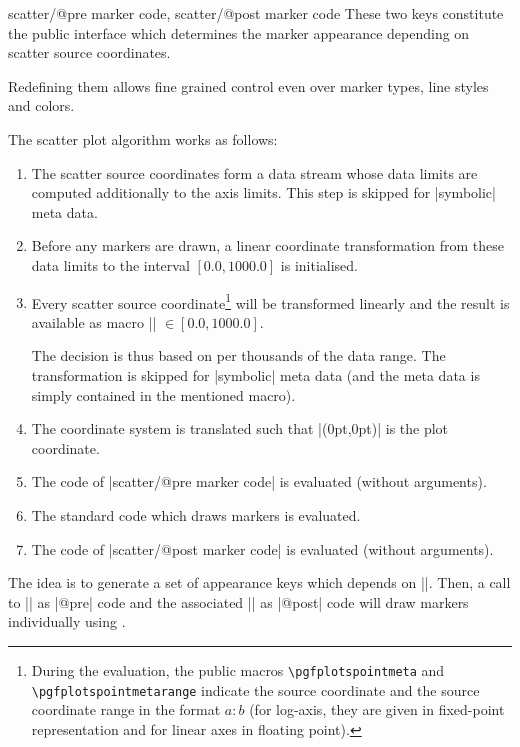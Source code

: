 {\begin{pgfplotsxycodekeylist}{%
    scatter/@pre marker code,
    scatter/@post marker code%
}
    These two keys constitute the public interface which determines the marker
    appearance depending on scatter source coordinates.

    Redefining them allows fine grained control even over marker types, line
    styles and colors.

    The scatter plot algorithm works as follows:
    \begin{enumerate}
        \item The scatter source coordinates form a data stream whose data
            limits are computed additionally to the axis limits. This step is
            skipped for |symbolic| meta data.
        \item Before any markers are drawn, a linear coordinate
            transformation from these data limits to the interval
            $[0.0,1000.0]$ is initialised.
        \item Every scatter source coordinate\footnote{During the evaluation,
            the public macros \texttt{\textbackslash pgfplotspointmeta} and
            \texttt{\textbackslash pgfplotspointmetarange} indicate the
            source coordinate and the source coordinate range in the format
            $a:b$ (for log-axis, they are given in fixed-point representation
            and for linear axes in floating point).} will be transformed
            linearly and the result is available as macro
            |\pgfplotspointmetatransformed| $ \in [0.0,1000.0]$.

            The decision is thus based on per thousands of the data range.
            The transformation is skipped for |symbolic| meta data (and the
            meta data is simply contained in the mentioned macro).
        \item The \pgfname{} coordinate system is translated such that
            |(0pt,0pt)| is the plot coordinate.
        \item The code of |scatter/@pre marker code| is evaluated (without
            arguments).
        \item The standard code which draws markers is evaluated.
        \item The code of |scatter/@post marker code| is evaluated (without
            arguments).
    \end{enumerate}
    The idea is to generate a set of appearance keys which depends on
    |\pgfplotspointmetatransformed|. Then, a call to |\scope| as |@pre| code and the associated |\endscope| as |@post| code will
    draw markers individually using .


\end{pgfplotsxycodekeylist}}

